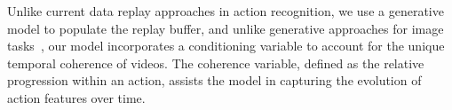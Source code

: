 

Unlike current data replay approaches in action recognition, we use a generative model to populate the replay buffer, and unlike generative approaches for image tasks~\cite{hayes2020remind,lesort2019generative,shin2017continual}, our model incorporates a conditioning variable to account for the unique temporal coherence of videos. The coherence variable, defined as the relative progression within an action, assists the model in capturing the evolution of action features over time. 